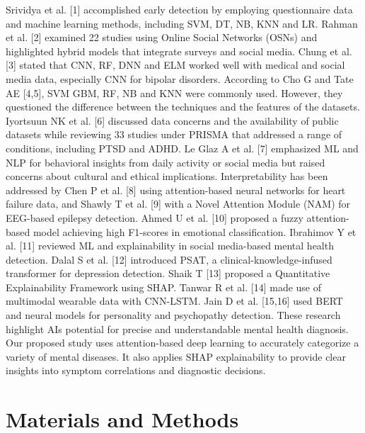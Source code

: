 \documentclass{article}
\begin{document}
Srividya et al. {[}1{]} accomplished early detection by employing questionnaire data and machine learning methods, including SVM, DT, NB, KNN and LR. Rahman et al. {[}2{]} examined 22 studies using Online Social Networks (OSNs) and highlighted hybrid models that integrate surveys and social media. Chung et al. {[}3{]} stated that CNN, RF, DNN and ELM worked well with medical and social media data, especially CNN for bipolar disorders. According to Cho G and Tate AE {[}4,5{]}, SVM GBM, RF, NB and KNN were commonly used. However, they questioned the difference between the techniques and the features of the datasets. Iyortsuun NK et al. {[}6{]} discussed data concerns and the availability of public datasets while reviewing 33 studies under PRISMA that addressed a range of conditions, including PTSD and ADHD. Le Glaz A et al. {[}7{]} emphasized ML and NLP for behavioral insights from daily activity or social media but raised concerns about cultural and ethical implications. Interpretability has been addressed by Chen P et al. {[}8{]} using attention-based neural networks for heart failure data, and Shawly T et al. {[}9{]} with a Novel Attention Module (NAM) for EEG-based epilepsy detection. Ahmed U et al. {[}10{]} proposed a fuzzy attention-based model achieving high F1-scores in emotional classification. Ibrahimov Y et al. {[}11{]} reviewed ML and explainability in social media-based mental health detection. Dalal S et al. {[}12{]} introduced PSAT, a clinical-knowledge-infused transformer for depression detection. Shaik T {[}13{]} proposed a Quantitative Explainability Framework using SHAP. Tanwar R et al. {[}14{]} made use of multimodal wearable data with CNN-LSTM. Jain D et al. {[}15,16{]} used BERT and neural models for personality and psychopathy detection. These research highlight AI\textquotesingle s potential for precise and understandable mental health diagnosis. Our proposed study uses attention-based deep learning to accurately categorize a variety of mental diseases. It also applies SHAP explainability to provide clear insights into symptom correlations and diagnostic decisions.

\section{Materials and Methods}
\end{document}
